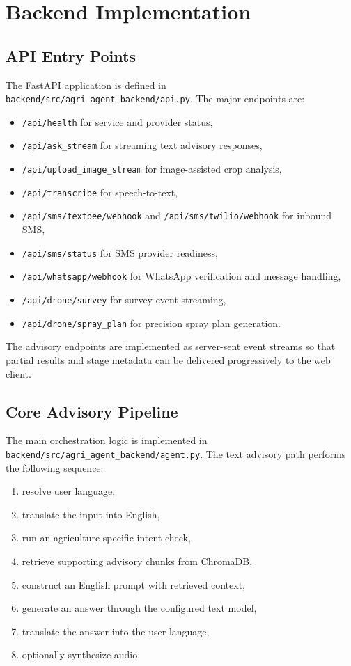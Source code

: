 \documentclass[11pt,a4paper]{article}
\begin{document}
\section{Backend Implementation}

\subsection{API Entry Points}

The FastAPI application is defined in \texttt{backend/src/agri\_agent\_backend/api.py}. The major endpoints are:

\begin{itemize}
  \item \texttt{/api/health} for service and provider status,
  \item \texttt{/api/ask\_stream} for streaming text advisory responses,
  \item \texttt{/api/upload\_image\_stream} for image-assisted crop analysis,
  \item \texttt{/api/transcribe} for speech-to-text,
  \item \texttt{/api/sms/textbee/webhook} and \texttt{/api/sms/twilio/webhook} for inbound SMS,
  \item \texttt{/api/sms/status} for SMS provider readiness,
  \item \texttt{/api/whatsapp/webhook} for WhatsApp verification and message handling,
  \item \texttt{/api/drone/survey} for survey event streaming,
  \item \texttt{/api/drone/spray\_plan} for precision spray plan generation.
\end{itemize}

The advisory endpoints are implemented as server-sent event streams so that partial results and stage metadata can be delivered progressively to the web client.

\subsection{Core Advisory Pipeline}

The main orchestration logic is implemented in \texttt{backend/src/agri\_agent\_backend/agent.py}. The text advisory path performs the following sequence:

\begin{enumerate}
  \item resolve user language,
  \item translate the input into English,
  \item run an agriculture-specific intent check,
  \item retrieve supporting advisory chunks from ChromaDB,
  \item construct an English prompt with retrieved context,
  \item generate an answer through the configured text model,
  \item translate the answer into the user language,
  \item optionally synthesize audio.
\end{enumerate}
\end{document}
